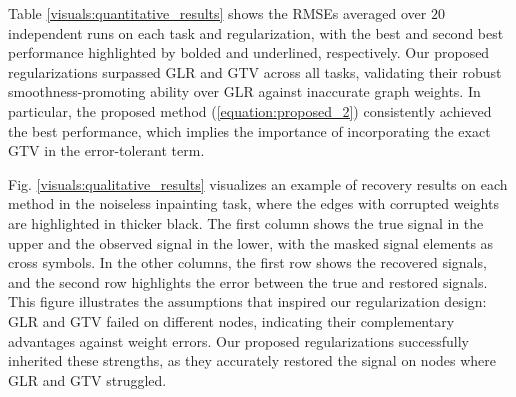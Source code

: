 
Table \ref{visuals:quantitative_results} shows the RMSEs averaged over $20$ independent runs on each task and regularization, with the best and second best performance highlighted by bolded and underlined, respectively.
Our proposed regularizations surpassed GLR and GTV across all tasks, validating their robust smoothness-promoting ability over GLR against inaccurate graph weights.
In particular, the proposed method (\ref{equation:proposed_2}) consistently achieved the best performance, which implies the importance of incorporating the exact GTV in the error-tolerant term.

Fig. \ref{visuals:qualitative_results} visualizes an example of recovery results on each method in the noiseless inpainting task, where the edges with corrupted weights are highlighted in thicker black.
The first column shows the true signal in the upper and the observed signal in the lower, with the masked signal elements as cross symbols.
In the other columns, the first row shows the recovered signals, and the second row highlights the error between the true and restored signals.
This figure illustrates the assumptions that inspired our regularization design: GLR and GTV failed on different nodes, indicating their complementary advantages against weight errors.
Our proposed regularizations successfully inherited these strengths, as they accurately restored the signal on nodes where GLR and GTV struggled.